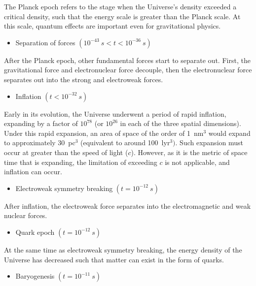 \documentclass[11pt,a4paper,notoc]{tufte-handout}
\providecommand{\tightlist}{%
  \setlength{\itemsep}{0pt}\setlength{\parskip}{0pt}}
\begin{document}
The Planck epoch refers to the stage when the Universe's density
exceeded a critical density, such that the energy scale is greater than
the Planck scale. At this scale, quantum effects are important even for
gravitational physics.

\begin{itemize}
\tightlist
\item
  Separation of forces \((10^{-43}~s < t < 10^{-36}~s)\)
\end{itemize}

After the Planck epoch, other fundamental forces start to separate out.
First, the gravitational force and electronuclear force decouple, then
the electronuclear force separates out into the strong and electroweak
forces.

\begin{itemize}
\tightlist
\item
  Inflation \((t < 10^{-32}~s)\)
\end{itemize}

Early in its evolution, the Universe underwent a period of rapid
inflation, expanding by a factor of \(10^{78}\) (or \(10^{26}\) in each of
the three spatial dimensions). Under this rapid expansion, an area of
space of the order of 1~nm\(^{3}\) would expand to approximately
30~pc\(^{3}\) (equivalent to around 100~lyr\(^{3})\). Such expansion must
occur at greater than the speed of light (\(c\)). However, as it is the
metric of space time that is expanding, the limitation of exceeding \(c\)
is not applicable, and inflation can occur.

\begin{itemize}
\tightlist
\item
  Electroweak symmetry breaking \((t = 10^{-12}~s)\)
\end{itemize}

After inflation, the electroweak force separates into the
electromagnetic and weak nuclear forces.

\begin{itemize}
\tightlist
\item
  Quark epoch \((t = 10^{-12}~s)\)
\end{itemize}

At the same time as electroweak symmetry breaking, the energy density of
the Universe has decreased such that matter can exist in the form of
quarks.

\begin{itemize}
\tightlist
\item
  Baryogenesis \((t = 10^{-11}~s)\)
\end{itemize}
\end{document}
